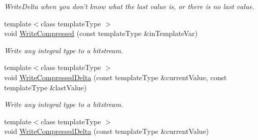 \begin{DoxyCompactItemize}
\begin{DoxyCompactList}\small\item\em Write\-Delta when you don't know what the last value is, or there is no last value. \end{DoxyCompactList}\item 
{\footnotesize template$<$class template\-Type $>$ }\\void \hyperlink{class_rak_net_1_1_bit_stream_ac32700a1c6f26d15890470dba1532ef4}{Write\-Compressed} (const template\-Type \&in\-Template\-Var)
\begin{DoxyCompactList}\small\item\em Write any integral type to a bitstream. \end{DoxyCompactList}\item 
{\footnotesize template$<$class template\-Type $>$ }\\void \hyperlink{class_rak_net_1_1_bit_stream_a1f8aab299cf0eb021802ed8671844948}{Write\-Compressed\-Delta} (const template\-Type \&current\-Value, const template\-Type \&last\-Value)
\begin{DoxyCompactList}\small\item\em Write any integral type to a bitstream. \end{DoxyCompactList}\item 
\hypertarget{class_rak_net_1_1_bit_stream_a3a5b260229e8b942a7909935d3a34340}{{\footnotesize template$<$class template\-Type $>$ }\\void \hyperlink{class_rak_net_1_1_bit_stream_a3a5b260229e8b942a7909935d3a34340}{Write\-Compressed\-Delta} (const template\-Type \&current\-Value)}\label{class_rak_net_1_1_bit_stream_a3a5b260229e8b942a7909935d3a34340}


\end{DoxyCompactItemize}

